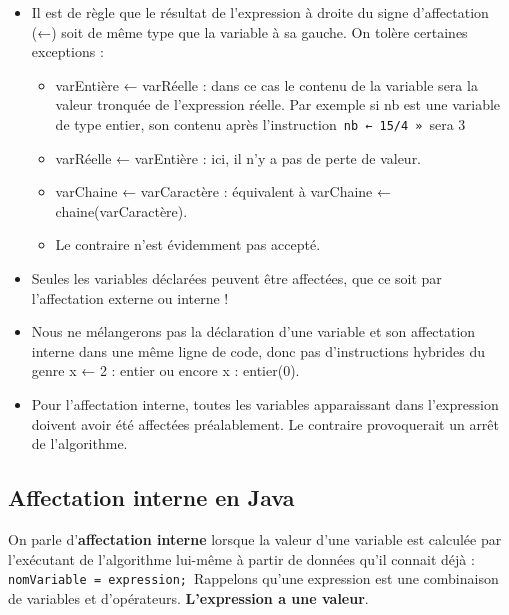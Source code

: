 \documentclass[11pt,a4paper]{article}
\begin{document}
					\begin{itemize}
				
			\item 
              Il est de r\`egle que le r\'esultat de l'expression \`a droite du signe d'affectation (←) soit de
              m\^eme type que la variable \`a sa gauche. On tol\`ere certaines exceptions :
              
					\begin{itemize}
				
			\item 
                  varEnti\`ere ← varR\'eelle : dans ce cas le contenu de la variable sera la valeur tronqu\'ee de l'expression r\'eelle. 
                  Par exemple si \guillemotleft  nb \guillemotright  est une variable de type entier,
                  son contenu apr\`es l'instruction \,\verb|nb ← 15/4 »|\, sera 3
                
			\item varR\'eelle ← varEnti\`ere : ici, il n'y a pas de perte de valeur.
			\item varChaine ← varCaract\`ere : \'equivalent \`a varChaine ← chaine(varCaract\`ere).
			\item Le contraire n'est \'evidemment pas accept\'e.
					\end{itemize}
				
			\item 
            Seules les variables d\'eclar\'ees peuvent \^etre affect\'ees, que ce soit par l'affectation externe
            ou interne !
            
			\item 
            Nous ne m\'elangerons pas la d\'eclaration d'une variable et son affectation interne dans
            une m\^eme ligne de code, donc pas d'instructions hybrides du genre x ← 2 : entier ou
            encore x : entier(0).
            
			\item 
            Pour l'affectation interne, toutes les variables apparaissant dans l'expression doivent
            avoir \'et\'e affect\'ees pr\'ealablement. Le contraire provoquerait un arr\^et de l'algorithme.
            
					\end{itemize}
				
            \par
        \subsection{Affectation interne en Java}
          On parle d'\textbf{affectation interne} lorsque la valeur d'une variable est \guillemotleft  calcul\'ee \guillemotright  par l'ex\'ecutant
          de l'algorithme lui-m\^eme \`a partir de donn\'ees qu'il connait d\'ej\`a :
          \,\verb|nomVariable = expression;|\,
          Rappelons qu'une expression est une combinaison de variables et d'op\'erateurs. \textbf{L'expression a une valeur}.
        
\end{document}
